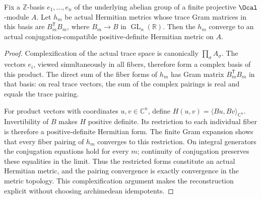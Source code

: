 \begin{lemma}
\label{lem:hermitian-frame-limit}
\leanok
{}
Fix a $\mathbb Z$-basis $e_1,\ldots,e_n$ of the underlying abelian group
of a finite projective $\Ocal$-module $A$.
Let $h_m$ be actual Hermitian metrics whose trace Gram matrices in this
basis are $B_m^{\mathsf T}B_m$, where $B_m\to B$ in
$\operatorname{GL}_n(\mathbb R)$. Then the $h_m$ converge to an actual
conjugation-compatible positive-definite Hermitian metric on $A$.
\end{lemma}
\begin{proof}
Complexification of the actual trace space is canonically
$\prod_\sigma A_\sigma$. The vectors $e_i$, viewed simultaneously in all
fibers, therefore form a complex basis of this product. The direct sum
of the fiber forms of $h_m$ has Gram matrix $B_m^{\mathsf T}B_m$ in
that basis: on real trace vectors, the sum of the complex pairings is
real and equals the trace pairing.

For product vectors with coordinates $u,v\in\mathbb C^n$, define
$H(u,v)=\langle Bu,Bv\rangle_{\mathbb C^n}$. Invertibility of $B$
makes $H$ positive definite. Its restriction to each individual fiber
is therefore a positive-definite Hermitian form. The finite Gram expansion
shows that every fiber pairing of $h_m$ converges to this restriction.
On integral generators the conjugation equations hold for every $m$;
continuity of conjugation preserves these equalities in the limit.
Thus the restricted forms constitute an actual Hermitian metric, and
the pairing convergence is exactly convergence in the metric topology.
This complexification argument makes the reconstruction explicit without
choosing archimedean idempotents.
\end{proof}

